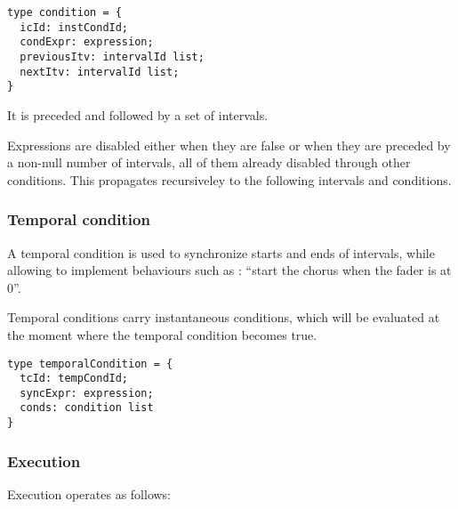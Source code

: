 \documentclass[applsci,article,submit,moreauthors,pdftex,10pt,a4paper]{mdpi}
\begin{document}
\begin{lstlisting}
type condition = {
  icId: instCondId;
  condExpr: expression;
  previousItv: intervalId list;
  nextItv: intervalId list;
}
\end{lstlisting}
It is preceded and followed by a set of intervals.

Expressions are disabled either when they are false or when they are preceded by a non-null number of intervals, all of them already disabled through other conditions. This propagates recursiveley to the following intervals and conditions. 

\subsubsection{Temporal condition}
A temporal condition is used to synchronize starts and ends of intervals, while allowing to implement behaviours such as : ``start the chorus when the fader is at 0''.

Temporal conditions carry instantaneous conditions, which will be evaluated at the moment where the temporal condition becomes true.


\begin{lstlisting}
type temporalCondition = {
  tcId: tempCondId;
  syncExpr: expression;
  conds: condition list
}
\end{lstlisting}

\subsubsection{Execution}
Execution operates as follows: 
\end{document}
